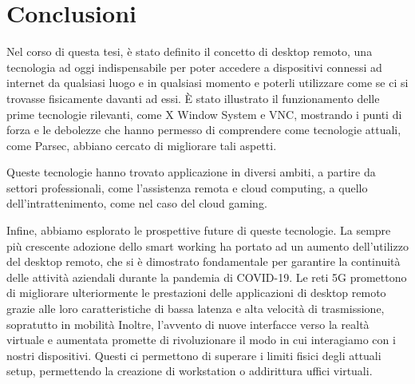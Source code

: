 \documentclass[12pt,a4paper,openright,twoside]{book}
\begin{document}

\chapter{Conclusioni}
\label{chap:conclusioni}

Nel corso di questa tesi, è stato definito il concetto di desktop remoto, una tecnologia ad oggi indispensabile per poter accedere a dispositivi connessi ad internet da qualsiasi luogo e in qualsiasi momento e poterli utilizzare come se ci si trovasse fisicamente davanti ad essi.
È stato illustrato il funzionamento delle prime tecnologie rilevanti, come X Window System e VNC, mostrando i punti di forza e le debolezze che hanno permesso di comprendere come tecnologie attuali, come Parsec, abbiano cercato di migliorare tali aspetti.

Queste tecnologie hanno trovato applicazione in diversi ambiti, a partire da settori professionali, come l'assistenza remota e cloud computing, a quello dell'intrattenimento, come nel caso del cloud gaming.

Infine, abbiamo esplorato le prospettive future di queste tecnologie. 
La sempre più crescente adozione dello smart working ha portato ad un aumento dell'utilizzo del desktop remoto, che si è dimostrato fondamentale per garantire la continuità delle attività aziendali durante la pandemia di COVID-19.
Le reti 5G promettono di migliorare ulteriormente le prestazioni delle applicazioni di desktop remoto grazie alle loro caratteristiche di bassa latenza e alta velocità di trasmissione, sopratutto in mobilità 
Inoltre, l'avvento di nuove interfacce verso la realtà virtuale e aumentata promette di rivoluzionare il modo in cui interagiamo con i nostri dispositivi.
Questi ci permettono di superare i limiti fisici degli attuali setup, permettendo la creazione di workstation o addirittura uffici virtuali.



\backmatter


    
\end{document}
